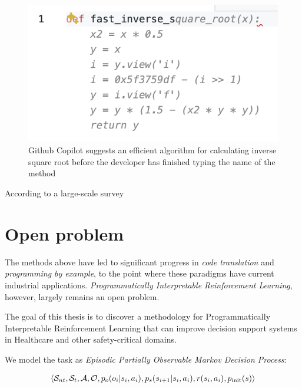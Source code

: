 \begin{figure}
    \centering
    \includegraphics{images/fastinversesqrt.png}
    \caption{Github Copilot \cite{dakhelGithubCopilotAi2023, nguyenEmpiricalEvaluationGitHub2022, wermelingerUsingGithubCopilot2023} suggests an efficient algorithm for calculating inverse square root \cite{lomontFastInverseSquare2003} before the developer has finished typing the name of the method}
    \label{fig:fastinversesqrt}
\end{figure}

According to a large-scale survey \cite{liangLargeScaleSurveyUsability2024} 

\newpage
\section{Open problem}
\label{sec:goal}


The methods above have led to significant progress in \emph{code translation} and \emph{programming by example}, to the point where these paradigms have current industrial applications.
\emph{Programmatically Interpretable Reinforcement Learning}, however, largely remains an open problem.

\begin{highlight}
The goal of this thesis is to discover a methodology for Programmatically Interpretable Reinforcement Learning that can improve decision support systems in Healthcare and other safety-critical domains.
\end{highlight}


We model the task as {\em Episodic Partially Observable Markov Decision Process}:

\begin{multline}
\langle \mathcal{S}_{nt}, \mathcal{S}_t, \mathcal{A}, \mathcal{O}, p_o(o_i | s_i, a_i), p_s(s_{i+1} | s_i, a_i), r(s_i,a_i), p_\text{init}(s) \rangle
\end{multline}

